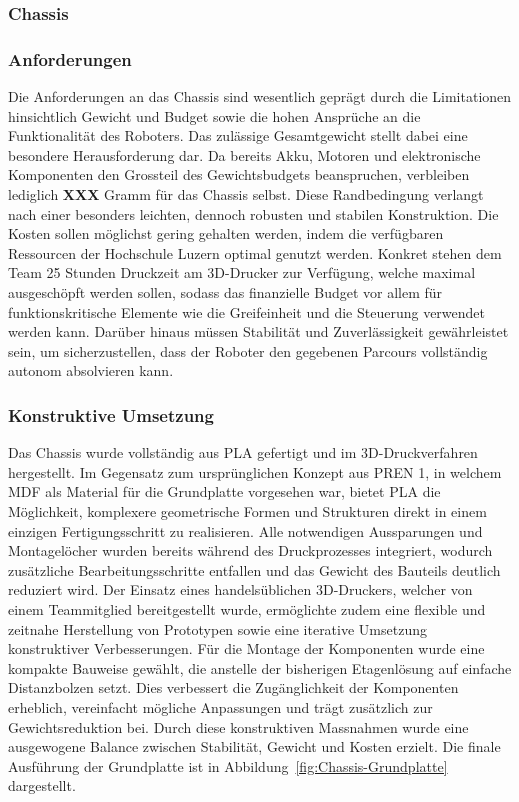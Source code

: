 \documentclass[main.tex]{subfiles} %
\begin{document}

\subsubsection{Chassis}

\subsubsection*{Anforderungen}

Die Anforderungen an das Chassis sind wesentlich geprägt durch die Limitationen 
hinsichtlich Gewicht und Budget sowie die hohen Ansprüche an die Funktionalität 
des Roboters. Das zulässige Gesamtgewicht stellt dabei eine besondere 
Herausforderung dar. Da bereits Akku, Motoren und elektronische Komponenten 
den Grossteil des Gewichtsbudgets beanspruchen, verbleiben lediglich \textbf{XXX} 
Gramm für das Chassis selbst. Diese Randbedingung verlangt nach einer besonders 
leichten, dennoch robusten und stabilen Konstruktion. Die Kosten sollen möglichst 
gering gehalten werden, indem die verfügbaren Ressourcen der Hochschule Luzern 
optimal genutzt werden. Konkret stehen dem Team 25 Stunden Druckzeit am 3D-Drucker 
zur Verfügung, welche maximal ausgeschöpft werden sollen, sodass das finanzielle 
Budget vor allem für funktionskritische Elemente wie die Greifeinheit 
und die Steuerung verwendet werden kann. Darüber hinaus müssen Stabilität und 
Zuverlässigkeit gewährleistet sein, um sicherzustellen, dass der Roboter den 
gegebenen Parcours vollständig autonom absolvieren kann.


\subsubsection*{Konstruktive Umsetzung}

Das Chassis wurde vollständig aus PLA gefertigt und im 3D-Druckverfahren 
hergestellt. Im Gegensatz zum ursprünglichen Konzept aus PREN 1, in welchem 
MDF als Material für die Grundplatte vorgesehen war, bietet PLA die 
Möglichkeit, komplexere geometrische Formen und Strukturen direkt in einem 
einzigen Fertigungsschritt zu realisieren. Alle notwendigen Aussparungen 
und Montagelöcher wurden bereits während des Druckprozesses integriert, 
wodurch zusätzliche Bearbeitungsschritte entfallen und das Gewicht des 
Bauteils deutlich reduziert wird. Der Einsatz eines handelsüblichen 
3D-Druckers, welcher von einem Teammitglied bereitgestellt wurde, 
ermöglichte zudem eine flexible und zeitnahe Herstellung von Prototypen 
sowie eine iterative Umsetzung konstruktiver Verbesserungen. Für die Montage 
der Komponenten wurde eine kompakte Bauweise gewählt, die anstelle der 
bisherigen Etagenlösung auf einfache Distanzbolzen setzt. Dies verbessert die 
Zugänglichkeit der Komponenten erheblich, vereinfacht mögliche Anpassungen 
und trägt zusätzlich zur Gewichtsreduktion bei. Durch diese konstruktiven 
Massnahmen wurde eine ausgewogene Balance zwischen Stabilität, Gewicht und 
Kosten erzielt. Die finale Ausführung der Grundplatte ist in 
Abbildung~\ref{fig:Chassis-Grundplatte} dargestellt.
\end{document}
